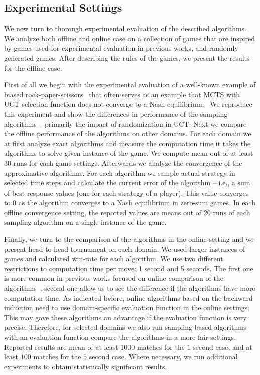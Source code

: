 
\subsection{Experimental Settings}

We now turn to thorough experimental evaluation of the described algorithms.
We analyze both offline and online case on a collection of games that are inspired by games used for experimental evaluation in previous works, and randomly generated games.
After describing the rules of the games, we present the results for the offline case. 

First of all we begin with the experimental evaluation of a well-known example of biased rock-paper-scissors~\cite{Shafiei09} that often serves as an example that MCTS with UCT selection function does not converge to a Nash equilibrium.~ 
We reproduce this experiment and show the differences in performance of the sampling algorithms -- primarily the impact of randomization in UCT.
Next we compare the offline performance of the algorithms on other domains.
For each domain we at first analyze exact algorithms and measure the computation time it takes the algorithms to solve given instance of the game. 
We compute mean out of at least $30$ runs for each game settings. 
Afterwards we analyze the convergence of the approximative algorithms.
For each algorithm we sample actual strategy in selected time steps and calculate the current error of the algorithm -- i.e., a sum of best-response values (one for each strategy of a player).
This value converges to $0$ as the algorithm converges to a Nash equilibrium in zero-sum games.
In each offline convergence setting, the reported values are means out of $20$ runs of each sampling algorithm on a single instance of the game.

Finally, we turn to the comparison of the algorithms in the online setting and we present head-to-head tournament on each domain.
We used larger instances of games and calculated win-rate for each algorithm.
We use two different restrictions to computation time per move: 1 second and 5 seconds. 
The first one is more common in previous works focused on online comparison of the algorithms~\cite{XXX}, second one allow us to see the difference if the algorithms have more computation time.
As indicated before, online algorithms based on the backward induction need to use domain-specific evaluation function in the online settings.
This may gave these algorithms an advantage if the evaluation function is very precise.
Therefore, for selected domains we also run sampling-based algorithms with an evaluation function compare the algorithms in a more fair settings.
Reported results are mean of at least $1000$ matches for the $1$ second case, and at least $100$ matches for the $5$ second case.
Where necessary, we run additional experiments to obtain statistically significant results.

